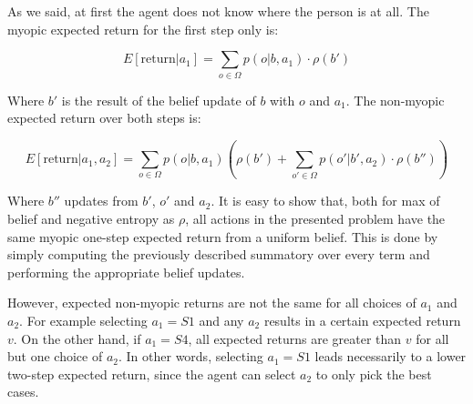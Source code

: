 \begin{center}
\end{center}

As we said, at first the agent does not know where the person is at all. The myopic expected return
for the first step only is:

\[ E[\text{return}| a_1 ] = \sum_{o\in \Omega} p(o | b, a_1) \cdot \rho(b') \]

Where $b'$ is the result of the belief update of $b$ with $o$ and $a_1$. The non-myopic expected return over
both steps is:

\[ E[\text{return}| a_1, a_2] = \sum_{o \in \Omega} p(o | b, a_1) \left ( \rho(b') + \sum_{o' \in
\Omega} p(o'| b', a_2) \cdot \rho(b'') \right ) \]

Where $b''$ updates from $b'$, $o'$ and $a_2$. It is easy to show that, both for max of belief and
negative entropy as $\rho$, all actions in the presented problem have the same myopic one-step
expected return from a uniform belief. This is done by simply computing the previously described
summatory over every term and performing the appropriate belief updates.

However, expected non-myopic returns are not the same for all choices of $a_1$ and $a_2$. For
example selecting $a_1 = S1$ and any $a_2$ results in a certain expected return $v$.  On the other
hand, if $a_1 = S4$, all expected returns are greater than $v$ for all but one choice of $a_2$. In
other words, selecting $a_1 = S1$ leads necessarily to a lower two-step expected return, since the
agent can select $a_2$ to only pick the best cases.

